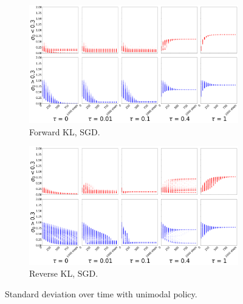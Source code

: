 \documentclass{article}
\begin{document}
\begin{figure}[!ht]
  \begin{subfigure}[b]{0.4\linewidth}
    \centering
    \includegraphics[width=1\columnwidth]{figs/bandit/notlearnQ/modes=1/sgd/std_forward_optim=sgd_modes=1_lr=0.01.png}
    \caption{Forward KL, SGD.}
    \label{fig:bandit-std-forward-sgd}
  \end{subfigure}%
  \begin{subfigure}[b]{0.4\linewidth}
    \centering
    \includegraphics[width=1\columnwidth]{figs/bandit/notlearnQ/modes=1/sgd/std_reverse_optim=sgd_modes=1_lr=0.01.png}
    \caption{Reverse KL, SGD.}
    \label{fig:bandit-std-reverse-sgd}
  \end{subfigure}
  \caption{Standard deviation over time with unimodal policy. }
\end{figure}
\end{document}
